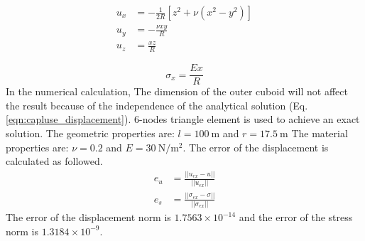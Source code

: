 \begin{subequations}
\begin{align}
  u_x &= -\frac{1}{2R}\left[z^2 + \nu \left(x^2 - y^2 \right)\right]\\
  u_y &= -\frac{\nu xy}{R}\\
  u_z &= \frac{xz}{R} 
  \label{eqn:capluse_displacement}
\end{align}
\end{subequations}

\begin{equation}
  \sigma_x = \frac{Ex}{R}
  \label{eqn:caplus_stress}
\end{equation}
%
In the numerical calculation, The dimension of the outer cuboid will not affect the result because of the independence of the analytical solution (Eq.\ref{eqn:capluse_displacement}). 6-nodes triangle element is used to achieve an exact solution.
The geometric properties are: $l=\SI{100}{\meter}$ and $r=\SI{17.5}{\meter}$
The material properties are: $\nu=0.2$ and $E=\SI{30}{\newton \per \square \meter}$.
The error of the displacement is calculated as followed.
\begin{subequations}
\begin{align}
e_u &= \frac{||u_{ex} - u||}{||u_{ex}||}\\
e_s &= \frac{||\sigma_{ex} - \sigma||}{||\sigma_{ex}||}
\end{align}
\end{subequations}
%
The error of the displacement norm is $1.7563\times 10^{-14}$ and the error of the stress norm is $1.3184\times 10^{-9}$.

